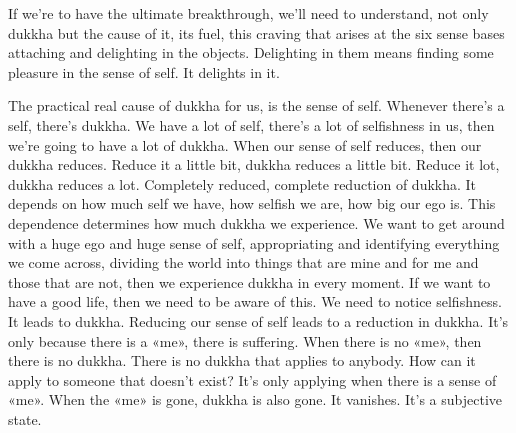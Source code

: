 \documentclass[letterpaper,10pt,english]{sphinxmanual}
\begin{document}
\sphinxAtStartPar
If we’re to have the ultimate breakthrough, we’ll need to understand,
not only dukkha but the cause of it, its fuel, this craving that arises at the
six sense bases attaching and delighting in the objects. Delighting in them
means finding some pleasure in the sense of self. It delights in it.

\sphinxAtStartPar
The practical real cause of dukkha for us, is the sense of self. Whenever there’s a self, there’s dukkha. We have a lot of self, there’s a lot of selfishness in us, then we’re going to have a lot of dukkha. When our sense of
self reduces, then our dukkha reduces. Reduce it a little bit, dukkha reduces a
little bit. Reduce it lot, dukkha reduces a lot. Completely reduced, complete
reduction of dukkha. It depends on how much self we have, how selfish we
are, how big our ego is. This dependence determines how much dukkha we
experience. We want to get around with a huge ego and huge sense of self,
appropriating and identifying everything we come across, dividing the world
into things that are mine and for me and those that are not, then we experience dukkha in every moment. If we want to have a good life, then we need
to be aware of this. We need to notice selfishness. It leads to dukkha. Reducing our sense of self leads to a reduction in dukkha. It’s only because there is
a «me», there is suffering. When there is no «me», then there is no dukkha.
There is no dukkha that applies to anybody. How can it apply to someone
that doesn’t exist? It’s only applying when there is a sense of «me». When
  the «me» is gone, dukkha is also gone. It vanishes. It’s a subjective state.
\end{document}

